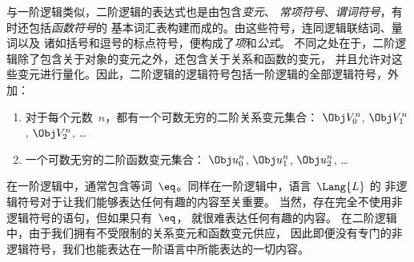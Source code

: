\documentclass[../../../include/open-logic-section]{subfiles}
\begin{document}


与一阶逻辑类似，二阶逻辑的表达式也是由包含\emph{变元}、
\emph{常项符号}、\emph{谓词符号}，有时还包括\emph{函数符号}的
基本词汇表构建而成的。由这些符号，连同逻辑联结词、量词以及
诸如括号和逗号的标点符号，便构成了\emph{项}和\emph{公式}。
不同之处在于，二阶逻辑除了包含关于对象的变元之外，还包含关于关系和函数的变元，
并且允许对这些变元进行量化。因此，二阶逻辑的逻辑符号包括一阶逻辑的全部逻辑符号，外加：

\begin{enumerate}
\item 对于每个元数~$n$，都有一个可数无穷的二阶关系变元集合：
  $\Obj V_0^n$, $\Obj V_1^n$, $\Obj V_2^n$, \dots
\item 一个可数无穷的二阶函数变元集合：
  $\Obj u_0^n$, $\Obj u_1^n$, $\Obj u_2^n$, \dots
\end{enumerate}

在一阶逻辑中，通常包含等词~$\eq$。同样在一阶逻辑中，语言~$\Lang{L}$ 的
非逻辑符号对于让我们能够表达任何有趣的内容至关重要。
当然，存在完全不使用非逻辑符号的语句，但如果只有~$\eq$，
就很难表达任何有趣的内容。
在二阶逻辑中，由于我们拥有不受限制的关系变元和函数变元供应，
因此即便没有专门的非逻辑符号，我们也能表达在一阶语言中所能表达的一切内容。
\end{document}
